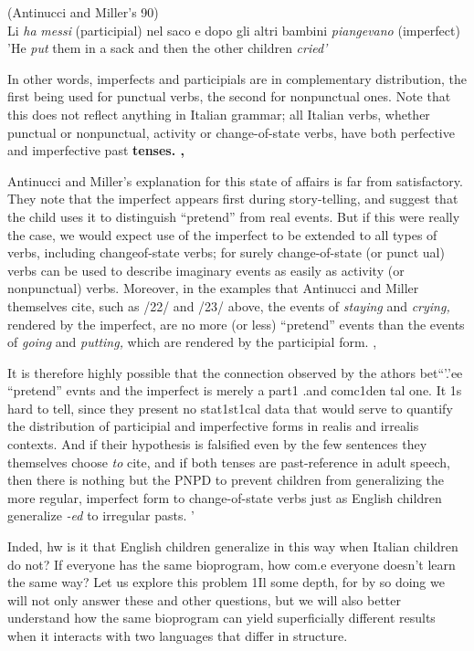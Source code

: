 \ea\label{ex:23}
 (Antinucci and Miller's 90)\\
  Li \textit{ha} \textit{messi }(participial) nel saco e dopo gli altri bambini \textit{piangevano }(imperfect) \\ 
\glt 'He \textit{put} them in a sack and then the other children \textit{cried'}
\z





In other words, imperfects and participials are in complementary distribution, the first being used for punctual verbs, the second for nonpunctual ones. Note that this does not reflect anything in Italian grammar; all Italian verbs, whether punctual or nonpunctual, activity or change-of-state verbs, have both perfective and imperfective past \textbf{tenses. ,}

Antinucci and Miller's explanation for this state of affairs is far from satisfactory. They note that the imperfect appears first during story-telling, and suggest that the child uses it to distinguish ``pretend'' from real events. But if this were really the case, we would expect use of the imperfect to be extended to all types of verbs, including change\-of-state verbs; for surely change-of-state (or punct ual) verbs can be used to describe imaginary events as easily as activity (or nonpunctual) verbs. Moreover, in the examples that Antinucci and Miller themselves cite, such as /22/ and /23/ above, the events of \textit{staying }and \textit{crying,} rendered by the imperfect, are no more (or less) ``pretend'' events than the events of \textit{going} and \textit{putting, }which are rendered by the participial form. ,


It is therefore highly possible that the connection observed by the athors bet``'.'ee ``pretend'' evnts and the imperfect is merely a part1 .and comc1den tal one. It 1s hard to tell, since they present no stat1st1cal data that would serve to quantify the distribution of participial and imperfective forms in realis and irrealis contexts. And if their hypothesis is falsified even by the few sentences they themselves choose \textit{to} cite, and if both tenses are past-reference in adult speech, then there is nothing but the PNPD to prevent children from general\-izing the more regular, imperfect form to change-of-state verbs just as English children generalize \textit{-ed} to irregular pasts. '

Inded, hw is it that English children generalize in this way when Italian children do not? If everyone has the same bioprogram, how com.e everyone doesn't learn the same way? Let us explore this problem 1Il some depth, for by so doing we will not only answer these and other questions, but we will also better understand how the same
bioprogram can yield superficially different results when it interacts with two languages that differ in structure.


